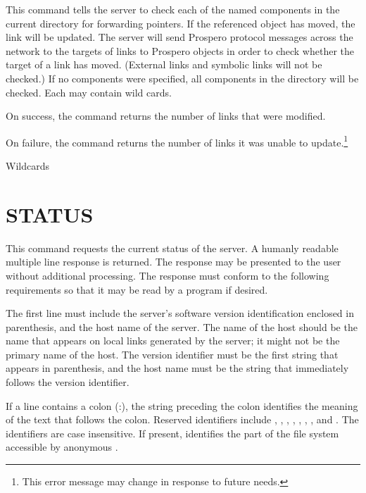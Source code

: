 This command tells the server to check each of the named components in
the current directory for forwarding pointers.  If the referenced
object has moved, the link will be updated.  The server will send
Prospero protocol messages across the network to the targets of links
to Prospero objects in order to check whether the target of a link has
moved.   (External links and symbolic links will not be checked.)  If
no components were specified, all components in the
directory will be checked.  Each  may contain
wild cards.

On success, the  command returns the
number of links that were modified.

\begin{command}
    
\end{command}

On failure, the  command returns the number of links it
was unable to update.\footnote{
	This error message may change in response to future needs.}

\begin{command}
    
\end{command}
Wildcards 

\section{STATUS}

This command requests the current status of the server.  A humanly
readable multiple line response is returned.  The response may be
presented to the user without additional processing.  The response
must conform to the following requirements so that it may be read by a
program if desired.

The first line must include the server's software version
identification enclosed in parenthesis, and the host name of the
server.  The name of the host should be the name that appears on local
links generated by the server; it might not be the primary name of the
host.  The version identifier must be the first string that appears in
parenthesis, and the host name must be the string that immediately
follows the version identifier.

If a line contains a colon (:), the string preceding the colon
identifies the meaning of the text that follows the colon.  Reserved
identifiers include , , ,
, , , , and .  The
identifiers are case insensitive.  If present,  
identifies the part of the file system accessible by anonymous .

